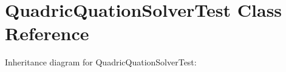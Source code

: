 \hypertarget{classQuadricQuationSolverTest}{}\section{Quadric\+Quation\+Solver\+Test Class Reference}
\label{classQuadricQuationSolverTest}


Inheritance diagram for Quadric\+Quation\+Solver\+Test\+:
